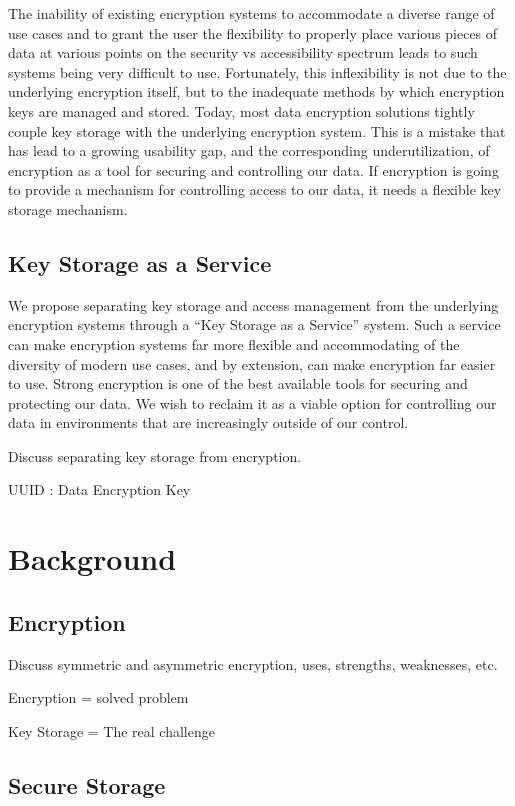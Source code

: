 The inability of existing encryption systems to accommodate a diverse
range of use cases and to grant the user the flexibility to properly
place various pieces of data at various points on the security vs
accessibility spectrum leads to such systems being very difficult to
use. Fortunately, this inflexibility is not due to the underlying
encryption itself, but to the inadequate methods by which encryption
keys are managed and stored. Today, most data encryption solutions
tightly couple key storage with the underlying encryption system. This
is a mistake that has lead to a growing usability gap, and the
corresponding underutilization, of encryption as a tool for securing
and controlling our data. If encryption is going to provide a
mechanism for controlling access to our data, it needs a flexible key
storage mechanism.

\subsection{Key Storage as a Service}

We propose separating key storage and access management from the
underlying encryption systems through a ``Key Storage as a Service''
system. Such a service can make encryption systems far more flexible
and accommodating of the diversity of modern use cases, and by
extension, can make encryption far easier to use. Strong encryption is
one of the best available tools for securing and protecting our
data. We wish to reclaim it as a viable option for controlling our
data in environments that are increasingly outside of our control.



Discuss separating key storage from encryption.

UUID : Data Encryption Key


\section{Background}

\subsection{Encryption}

Discuss symmetric and asymmetric encryption, uses, strengths,
weaknesses, etc.

Encryption = solved problem

Key Storage = The real challenge

\subsection{Secure Storage}

